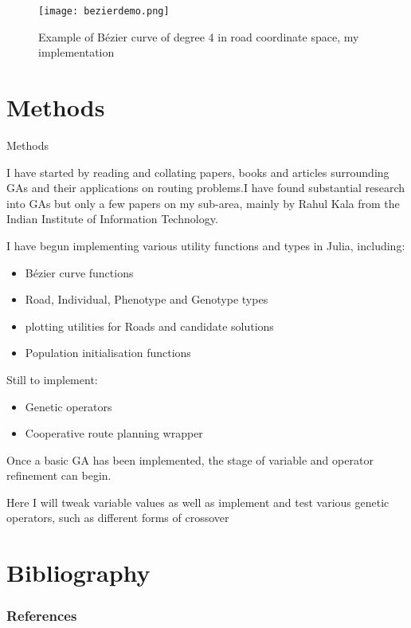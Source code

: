 \documentclass{beamer}
\begin{document}
\begin{frame}
    \begin{figure}[htpb]
        \centering
        \texttt{[image: bezierdemo.png]}
        \caption{Example of Bézier curve of degree 4 in road coordinate space, my implementation}%
        \label{fig:bezierdemo}
    \end{figure}
\end{frame}

\section{Methods}

\begin{frame}{Methods}

I have started by reading and collating papers, books and articles surrounding GAs and their applications on routing problems.I have found substantial research into GAs but only a few papers on my sub-area, mainly by Rahul Kala from the Indian Institute of Information Technology.

I have begun implementing various utility functions and types in Julia\cite{JuliaProgrammingLanguage}, including:

\begin{itemize}
    \item Bézier curve functions
    \item Road, Individual, Phenotype and Genotype types
    \item plotting utilities for Roads and candidate solutions
    \item Population initialisation functions
\end{itemize}

Still to implement: 

\begin{itemize}
    \item Genetic operators
    \item Cooperative route planning wrapper
\end{itemize}

\end{frame}
\begin{frame}
Once a basic GA has been implemented, the stage of variable and operator refinement can begin.

Here I will tweak variable values as well as implement and test various genetic operators, such as different forms of crossover 

\end{frame}

\section{Bibliography}
\begin{frame}[allowframebreaks]
\frametitle{References}


\end{frame}
\end{document}
